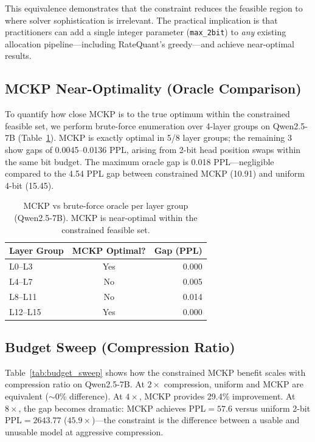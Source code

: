\documentclass[11pt,a4paper]{article}
\begin{document}
This equivalence demonstrates that the constraint reduces the feasible region to where solver sophistication is irrelevant.
The practical implication is that practitioners can add a single integer parameter (\texttt{max\_2bit}) to \emph{any} existing allocation pipeline---including RateQuant's greedy---and achieve near-optimal results.

\subsection{MCKP Near-Optimality (Oracle Comparison)}

To quantify how close MCKP is to the true optimum within the constrained feasible set, we perform brute-force enumeration over 4-layer groups on Qwen2.5-7B (Table~\ref{tab:oracle}).
MCKP is exactly optimal in 5/8 layer groups; the remaining 3 show gaps of 0.0045--0.0136 PPL, arising from 2-bit head position swaps within the same bit budget.
The maximum oracle gap is 0.018 PPL---negligible compared to the 4.54 PPL gap between constrained MCKP (10.91) and uniform 4-bit (15.45).

\begin{table}[h]
\centering
\caption{MCKP vs brute-force oracle per layer group (Qwen2.5-7B). MCKP is near-optimal within the constrained feasible set.}
\label{tab:oracle}
\begin{tabular}{@{}lcr@{}}
\toprule
Layer Group & MCKP Optimal? & Gap (PPL) \\
\midrule
L0--L3  & Yes & 0.000 \\
L4--L7  & No  & 0.005 \\
L8--L11 & No  & 0.014 \\
L12--L15 & Yes & 0.000 \\
\bottomrule
\end{tabular}
\end{table}

\subsection{Budget Sweep (Compression Ratio)}

Table~\ref{tab:budget_sweep} shows how the constrained MCKP benefit scales with compression ratio on Qwen2.5-7B.
At $2\times$ compression, uniform and MCKP are equivalent ($\sim 0\%$ difference).
At $4\times$, MCKP provides 29.4\% improvement.
At $8\times$, the gap becomes dramatic: MCKP achieves PPL$=57.6$ versus uniform 2-bit PPL$=2643.77$ ($45.9\times$)---the constraint is the difference between a usable and unusable model at aggressive compression.
\end{document}
